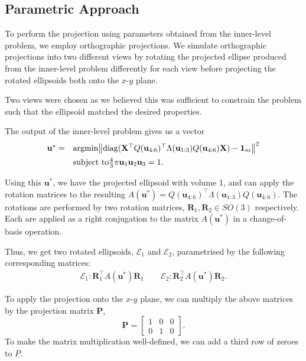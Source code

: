 \documentclass{article}
\DeclareMathOperator*{\argmin}{argmin}
\begin{document}
\subsection{Parametric Approach}
To perform the projection using parameters obtained from the inner-level problem, we employ orthographic projections. We simulate orthographic projections into two different views by rotating the projected ellipse produced from the inner-level problem differently for each view before projecting the rotated ellipsoids both onto the $x$-$y$ plane.

Two views were chosen as we believed this was sufficient to constrain the problem such that the ellipsoid matched the desired properties.

The output of the inner-level problem gives us a vector 
$$
\begin{array}{ll}
    \mathbf u^* = &\argmin \lr\Vert\Vert {\text{diag}(\mathbf X^\top Q(\mathbf u_{4:6}) ^\top \Lambda(\mathbf u_{1:3}) Q(\mathbf u_{4:6}) \mathbf X) - \mathbf 1_m} ^2 \\[0.5em] &\text{subject to} \frac{4}{3} \pi \mathbf u_1 \mathbf u_2 \mathbf u_3 = 1.
\end{array}          
$$

Using this $\mathbf u^*$, we have the projected ellipsoid with volume 1, and can apply the rotation matrices to the resulting $A(\mathbf u^*) = Q(\mathbf u_{4:6}) ^\top \Lambda(\mathbf u_{1:3}) Q(\mathbf u_{4:6})$. The rotations are performed by two rotation matrices, $\mathbf R_1, \mathbf R_2 \in SO(3)$ respectively. Each are applied as a right conjugation to the matrix $A(\mathbf u^*)$ in a change-of-basis operation.

Thus, we get two rotated ellipsoids, $\mathcal E_1$ and $\mathcal E_2$, parametrised by the following corresponding matrices:
\begin{align}
    \mathcal E_1: \mathbf{R}_1^\top A(\mathbf u^*) \mathbf{R}_1 \qquad \mathcal E_2: \mathbf{R}_2^\top A(\mathbf u^*) \mathbf{R}_2.
\end{align}

To apply the projection onto the $x$-$y$ plane, we can multiply the above matrices by the projection matrix $\mathbf P$,
\begin{equation}
    \mathbf P = \begin{bmatrix}
        1 & 0 & 0\\
        0 & 1 & 0
    \end{bmatrix}.
\end{equation}
To make the matrix multiplication well-defined, we can add a third row of zeroes to $P$.
\end{document}
